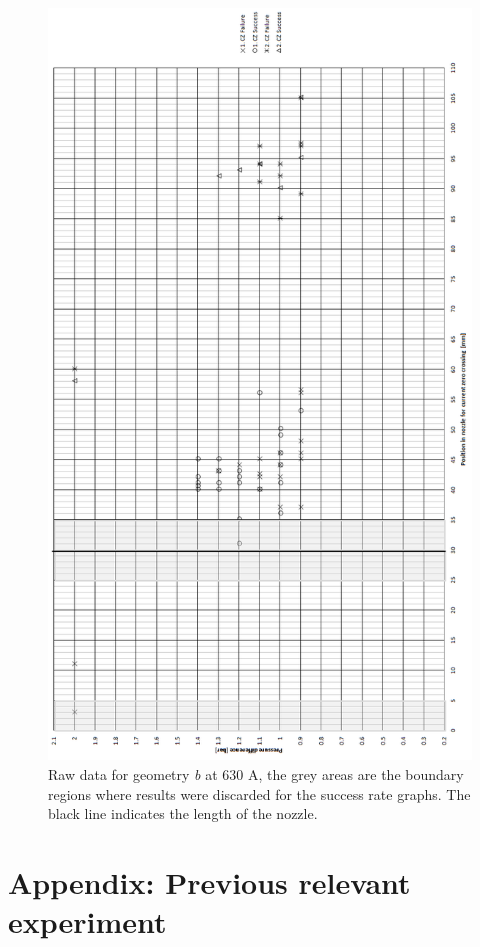 \documentclass[10pt,a4paper,twoside]{article}
\begin{document}
\begin{figure}[H]
\centering
\includegraphics[scale=0.55]{Bilder/Results/rawData630AgeoB.png}
\caption{Raw data for geometry \textit{b} at 630 A, the grey areas are the boundary regions where results were discarded for the success rate graphs. The black line indicates the length of the nozzle.} \label{fig:rawData630AgeoB}
\end{figure}

\cleardoublepage
\section{Appendix: Previous relevant experiment} \label{app:PrevReleEx}
\makeatletter 
\renewcommand{\thefigure}{B.\@arabic\c@figure}
\makeatother
\end{document}
